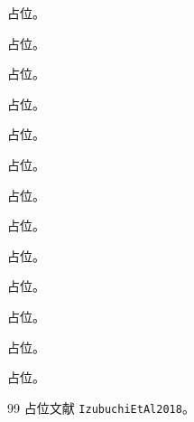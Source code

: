 \begin{remark}[占位]\label{rem:lamet-ratio-large-z}占位。\end{remark}
\begin{table}[h]\centering\caption{占位}\label{tab:lamet-dependency}\end{table}
\begin{table}[h]\centering\caption{占位}\label{tab:summary-assumptions}\end{table}
\begin{table}[h]\centering\caption{占位}\label{tab:summary-master}\end{table}
\begin{theorem}[占位]\label{thm:dis-ope}占位。\end{theorem}
\begin{theorem}[占位]\label{thm:heavy-bdpi}占位。\end{theorem}
\begin{theorem}[占位]\label{thm:lamet-coordinate}占位。\end{theorem}
\begin{theorem}[占位]\label{thm:lamet-hadronic}占位。\end{theorem}
\begin{theorem}[占位]\label{thm:lamet-parton-momentum}占位。\end{theorem}
\begin{theorem}[占位]\label{thm:lattice-lamet}占位。\end{theorem}
\begin{theorem}[占位]\label{thm:pdf-dglap}占位。\end{theorem}
\begin{theorem}[占位]\label{thm:pdf-moments-local}占位。\end{theorem}
\begin{theorem}[占位]\label{thm:yzliu-analyticity}占位。\end{theorem}
\begin{theorem}[占位]\label{thm:yzliu-soft-hqet}占位。\end{theorem}
\begin{theorem}[占位]\label{thm:yzliu-threshold}占位。\end{theorem}
\begin{theorem}[占位]\label{thm:yzliu-time-ordering}占位。\end{theorem}
\begin{thebibliography}{99}
 占位文献 \texttt{IzubuchiEtAl2018}。
\end{thebibliography}

